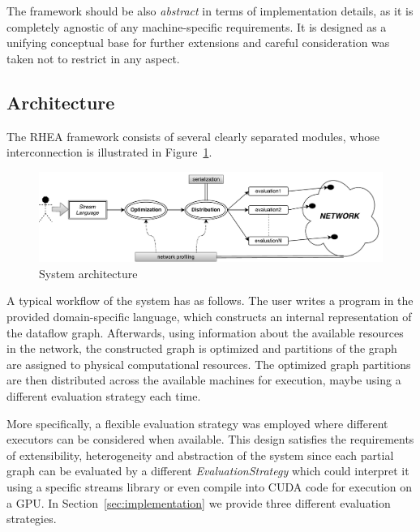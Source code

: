 \documentclass[sigplan,screen,review,anonymous]{acmart}
\begin{document}
The framework should be also \textit{abstract} in terms of implementation details,
as it is completely agnostic of any machine-specific requirements. It is designed as a
unifying conceptual base for further extensions and careful consideration was
taken not to restrict in any aspect.

\subsection{Architecture}
The \textsc{RHEA} framework consists of several clearly separated modules,
whose interconnection is illustrated in Figure~\ref{fig:architecture}.
%
\begin{figure}
  \centering
  \includegraphics[scale=0.6]{architecture}
    \caption{System architecture}
    \label{fig:architecture}
\end{figure}

A typical workflow of the system has as follows. The user writes a program in
the provided domain-specific language, which constructs an internal representation
of the dataflow graph. Afterwards, using information about the available
resources in the network, the constructed graph is optimized and partitions of the
graph are assigned to physical computational resources. The optimized graph partitions are
then distributed across the available machines for execution, maybe using a
different evaluation strategy each time.

More specifically, a flexible evaluation strategy was employed where different
executors can be considered when available. This design satisfies the requirements
of extensibility, heterogeneity and abstraction of the system since each partial
graph can be evaluated by a different \textit{EvaluationStrategy} which could
interpret it using a specific streams library or even compile into CUDA code
for execution on a GPU. In Section~\ref{sec:implementation} we provide three
different evaluation strategies.
\end{document}
